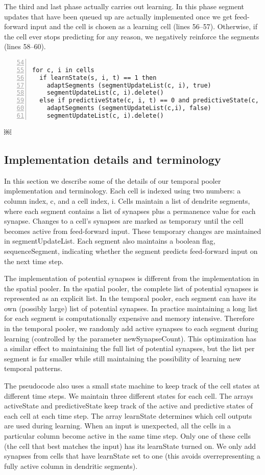 The third and last phase actually carries out learning. In this phase
segment updates that have been queued up are actually implemented once
we get feed-forward input and the cell is chosen as a learning cell
(lines 56--57). Otherwise, if the cell ever stops predicting for any
reason, we negatively reinforce the segments (lines 58--60).

\begin{lstlisting}[numbers=left,firstnumber=54]￼
for c, i in cells
  if learnState(s, i, t) == 1 then
    adaptSegments (segmentUpdateList(c, i), true)
    segmentUpdateList(c, i).delete()
  else if predictiveState(c, i, t) == 0 and predictiveState(c, i, t-1)==1 then
    adaptSegments (segmentUpdateList(c,i), false)
    segmentUpdateList(c, i).delete()
\end{lstlisting}￼

\subsection*{Implementation details and terminology}
In this section we describe some of the details of our temporal pooler
implementation and terminology. Each cell is indexed using two
numbers: a column index, c, and a cell index, i. Cells maintain a list
of dendrite segments, where each segment contains a list of synapses
plus a permanence value for each synapse. Changes to a cell's synapses
are marked as temporary until the cell becomes active from
feed-forward input. These temporary changes are maintained in
segmentUpdateList. Each segment also maintains a boolean flag,
sequenceSegment, indicating whether the segment predicts feed-forward
input on the next time step.

The implementation of potential synapses is different from the
implementation in the spatial pooler. In the spatial pooler, the
complete list of potential synapses is represented as an explicit
list. In the temporal pooler, each segment can have its own (possibly
large) list of potential synapses. In practice maintaining a long list
for each segment is computationally expensive and memory
intensive. Therefore in the temporal pooler, we randomly add active
synapses to each segment during learning (controlled by the parameter
newSynapseCount). This optimization has a similar effect to
maintaining the full list of potential synapses, but the list per
segment is far smaller while still maintaining the possibility of
learning new temporal patterns.

The pseudocode also uses a small state machine to keep track of the
cell states at different time steps. We maintain three different
states for each cell. The arrays activeState and predictiveState keep
track of the active and predictive states of each cell at each time
step. The array learnState determines which cell outputs are used
during learning. When an input is unexpected, all the cells in a
particular column become active in the same time step. Only one of
these cells (the cell that best matches the input) has its learnState
turned on. We only add synapses from cells that have learnState set to
one (this avoids overrepresenting a fully active column in dendritic
segments).

